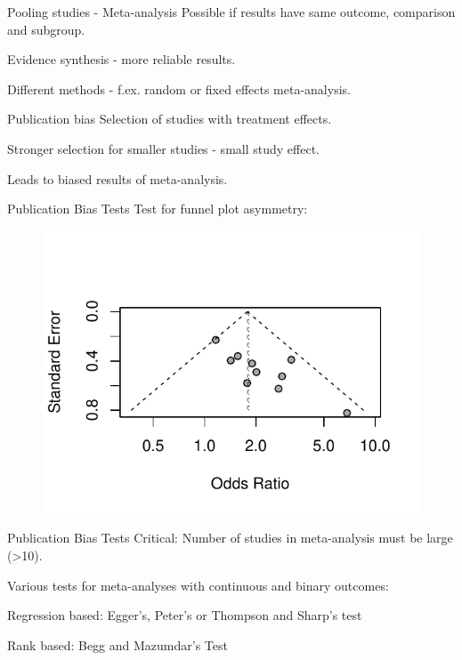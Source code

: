 \documentclass[english]{beamer}\usepackage[]{graphicx}\usepackage[]{color}
\makeatletter
\def\maxwidth{ %
  \ifdim\Gin@nat@width>\linewidth
    \linewidth
  \else
    \Gin@nat@width
  \fi
}
\newenvironment{knitrout}{}{} %
\makeatother
\begin{document}
\begin{frame}{Pooling studies - Meta-analysis}
Possible if results have same outcome, comparison and subgroup.

Evidence synthesis - more reliable results.

Different methods - f.ex. random or fixed effects meta-analysis.
\end{frame}

\begin{frame}{Publication bias}
Selection of studies with treatment effects.

Stronger selection for smaller studies - small study effect.

Leads to biased results of meta-analysis.
\end{frame}

\begin{frame}{Publication Bias Tests}
Test for funnel plot asymmetry:

\vspace{-1cm}
\begin{figure}[fragile]
\begin{knitrout}
\color{fgcolor}
\includegraphics[width=\maxwidth]{figure/unnamed-chunk-4-1} 

\end{knitrout}
\end{figure}
\end{frame}

\begin{frame}{Publication Bias Tests}
Critical: Number of studies in meta-analysis must be large (>10).

Various tests for meta-analyses with continuous and binary outcomes:

Regression based: Egger's, Peter's or Thompson and Sharp's test

Rank based: Begg and Mazumdar's Test
\end{frame}
\end{document}
